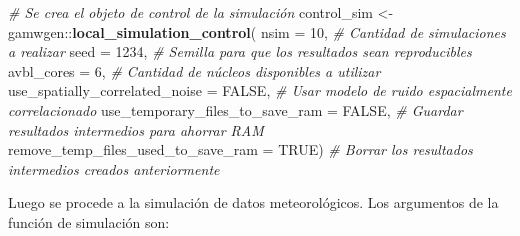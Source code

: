 \documentclass[
  12pt]{article}
\newenvironment{Shaded}{}{}
\newcommand{\CommentTok}[1]{\textcolor[rgb]{0.38,0.63,0.69}{\textit{#1}}}
\newcommand{\DataTypeTok}[1]{\textcolor[rgb]{0.56,0.13,0.00}{#1}}
\newcommand{\DecValTok}[1]{\textcolor[rgb]{0.25,0.63,0.44}{#1}}
\newcommand{\KeywordTok}[1]{\textcolor[rgb]{0.00,0.44,0.13}{\textbf{#1}}}
\newcommand{\NormalTok}[1]{#1}
\newcommand{\OperatorTok}[1]{\textcolor[rgb]{0.40,0.40,0.40}{#1}}
\newcommand{\OtherTok}[1]{\textcolor[rgb]{0.00,0.44,0.13}{#1}}
\newcommand{\StringTok}[1]{\textcolor[rgb]{0.25,0.44,0.63}{#1}}
\begin{document}
\begin{Shaded}
\begin{Highlighting}[]
\CommentTok{# Se crea el objeto de control de la simulación}
\NormalTok{control_sim <-}\StringTok{ }\NormalTok{gamwgen}\OperatorTok{::}\KeywordTok{local_simulation_control}\NormalTok{(}
  \DataTypeTok{nsim =} \DecValTok{10}\NormalTok{, }
  \CommentTok{# Cantidad de simulaciones a realizar}
  \DataTypeTok{seed =} \DecValTok{1234}\NormalTok{, }
  \CommentTok{# Semilla para que los resultados sean reproducibles}
  \DataTypeTok{avbl_cores =} \DecValTok{6}\NormalTok{, }
  \CommentTok{# Cantidad de núcleos disponibles a utilizar}
  \DataTypeTok{use_spatially_correlated_noise =} \OtherTok{FALSE}\NormalTok{, }
  \CommentTok{# Usar modelo de ruido espacialmente correlacionado}
  \DataTypeTok{use_temporary_files_to_save_ram =} \OtherTok{FALSE}\NormalTok{, }
  \CommentTok{# Guardar resultados intermedios para ahorrar RAM}
  \DataTypeTok{remove_temp_files_used_to_save_ram =} \OtherTok{TRUE}\NormalTok{) }
  \CommentTok{# Borrar los resultados intermedios creados anteriormente}
\end{Highlighting}
\end{Shaded}

Luego se procede a la simulación de datos meteorológicos. Los argumentos de la función de simulación son:
\end{document}
